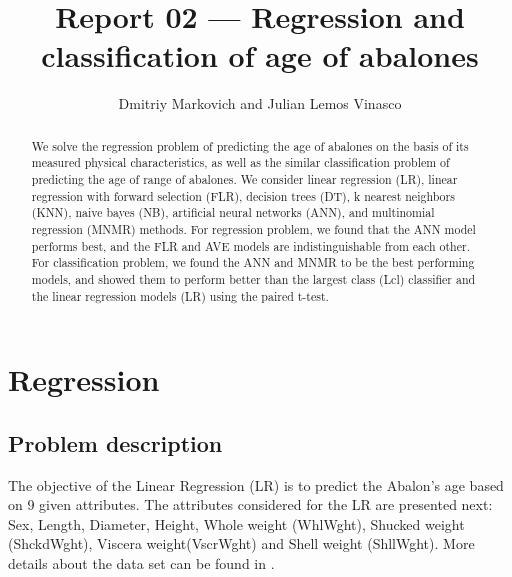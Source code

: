 \documentclass[10pt, paper=a4]{article}
\begin{document}
\title{Report 02 --- Regression and classification of age of abalones}

\author{Dmitriy Markovich and Julian Lemos Vinasco}

\date{}

\maketitle

\begin{abstract}
  We solve the regression problem of predicting the age of abalones on
  the basis of its measured physical characteristics, as well as the
  similar classification problem of predicting the age of range of
  abalones.  We consider linear regression (LR), linear regression
  with forward selection (FLR), decision trees (DT), k nearest
  neighbors (KNN), naive bayes (NB), artificial neural networks (ANN),
  and multinomial regression (MNMR) methods.  For regression problem,
  we found that the ANN model performs best, and the FLR and AVE
  models are indistinguishable from each other.  For classification
  problem, we found the ANN and MNMR to be the best performing models,
  and showed them to perform better than the largest class (Lcl)
  classifier and the linear regression models (LR) using the paired
  t-test.
\end{abstract}

\section{Regression}
\label{sec:regression}

\subsection{Problem description}
The objective of the Linear Regression (LR) is to predict the Abalon's age based
on 9 given attributes. The attributes considered for the LR are presented next: Sex, Length, Diameter, Height, Whole weight (WhlWght), Shucked weight (ShckdWght), Viscera weight(VscrWght) and Shell weight (ShllWght).  More details about the data
set can be found in \cite{datadescription}.
\end{document}
